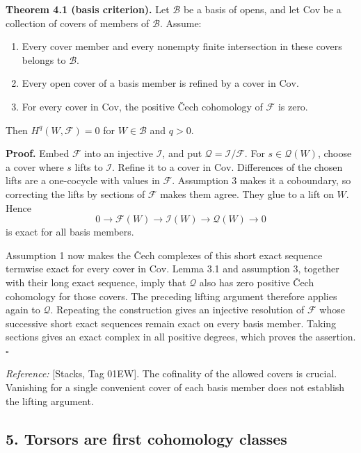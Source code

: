 \documentclass[11pt]{article}
\providecommand{\tightlist}{\setlength{\itemsep}{0pt}\setlength{\parskip}{0pt}}
\begin{document}
\textbf{Theorem 4.1 (basis criterion).} Let \(\mathcal B\) be a basis of
opens, and let \(\mathrm{Cov}\) be a collection of covers of members of
\(\mathcal B\). Assume:

\begin{enumerate}
\def\labelenumi{\arabic{enumi}.}
\tightlist
\item
  Every cover member and every nonempty finite intersection in these
  covers belongs to \(\mathcal B\).
\item
  Every open cover of a basis member is refined by a cover in
  \(\mathrm{Cov}\).
\item
  For every cover in \(\mathrm{Cov}\), the positive Čech cohomology of
  \(\mathcal F\) is zero.
\end{enumerate}

Then \(H^q(W,\mathcal F)=0\) for \(W\in\mathcal B\) and \(q>0\).

\textbf{Proof.} Embed \(\mathcal F\) into an injective \(\mathcal I\),
and put \(\mathcal Q=\mathcal I/\mathcal F\). For \(s\in\mathcal Q(W)\),
choose a cover where \(s\) lifts to \(\mathcal I\). Refine it to a cover
in \(\mathrm{Cov}\). Differences of the chosen lifts are a one-cocycle
with values in \(\mathcal F\). Assumption 3 makes it a coboundary, so
correcting the lifts by sections of \(\mathcal F\) makes them agree.
They glue to a lift on \(W\). Hence \[
0\to\mathcal F(W)\to\mathcal I(W)\to\mathcal Q(W)\to0
\] is exact for all basis members.

Assumption 1 now makes the Čech complexes of this short exact sequence
termwise exact for every cover in \(\mathrm{Cov}\). Lemma 3.1 and
assumption 3, together with their long exact sequence, imply that
\(\mathcal Q\) also has zero positive Čech cohomology for those covers.
The preceding lifting argument therefore applies again to
\(\mathcal Q\). Repeating the construction gives an injective resolution
of \(\mathcal F\) whose successive short exact sequences remain exact on
every basis member. Taking sections gives an exact complex in all
positive degrees, which proves the assertion. \(\square\)

\emph{Reference:} {[}Stacks, Tag 01EW{]}. The cofinality of the allowed
covers is crucial. Vanishing for a single convenient cover of each basis
member does not establish the lifting argument.

\subsection{5. Torsors are first cohomology
classes}\label{torsors-are-first-cohomology-classes}
\end{document}
